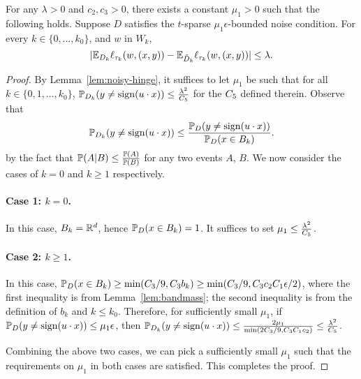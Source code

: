 \begin{lemma}
For any $\lambda > 0$ and $c_2, c_3 > 0$, there exists a constant $\mu_1 > 0$ such that the following holds. Suppose $D$ satisfies the $t$-sparse $\mu_1 \epsilon$-bounded
noise condition. For every $k \in \{0,\ldots,k_0\}$, and $w$ in $W_k$,
\[
| \E_{D_k} \ell_{\tau_k}(w, (x, y)) - \E_{\tilde{D}_k} \ell_{\tau_k}(w, (x, y)) |
\leq
\lambda.
\]
\label{lem:tv-an}
\end{lemma}
\begin{proof}
By Lemma~\ref{lem:noisy-hinge}, it suffices to let $\mu_1$ be such that for all $k \in \{0,1,\ldots,k_0\}$, $\P_{D_k}(y \neq \sign(u \cdot x)) \leq \frac{\lambda^2}{\ct }$ for the $\ct$ defined therein.
Observe that
\[ \P_{D_k}(y \neq \sign(u \cdot x)) \leq \frac{\P_D(y \neq \sign(u \cdot x))}{\P_D(x \in B_k)}. \]
by the fact that $\P(A|B) \leq \frac{\P(A)}{\P(B)}$ for any two events $A$, $B$.
We now consider the cases of $k=0$ and $k \geq 1$ respectively.

\paragraph{Case 1: $k = 0$.} In this case, $B_k = \R^d$, hence $\P_D(x \in B_k) = 1$. It suffices to set $\mu_1 \leq \frac{\lambda^2}{\ct }$.

\paragraph{Case 2: $k \geq 1$.} In this case, $\P_D(x \in B_k) \geq \min(\cf /9, \cf  b_k) \geq \min(\cf /9, \cf  c_2 C_1 \epsilon / 2)$, where the first inequality is from Lemma~\ref{lem:bandmass}; the second inequality is from the definition of $b_k$ and $k \leq k_0$.
Therefore, for sufficiently small $\mu_1$, if $\P_D(y \neq \sign(u \cdot x)) \leq \mu_1 \epsilon$, then $\P_{D_k}(y \neq \sign(u \cdot x)) \leq \frac{2 \mu_1}{\min(2\cf /9, \cf  C_1 c_2)} \leq \frac{\lambda^2}{\ct }$.

Combining the above two cases, we can pick a sufficiently small $\mu_1$ such that the requirements on $\mu_1$ in both cases are satisfied. This completes the proof.
\end{proof}



